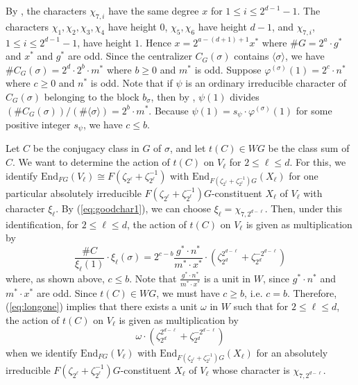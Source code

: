 \documentclass{amsart}
\theoremstyle{plain}
\theoremstyle{definition}
\theoremstyle{remark}
\begin{document}
By \cite{olsson}, the characters $\chi_{7,i}$ have the same degree $x$ for $1\le i\le 2^{d-1}-1$. The characters $\chi_1,\chi_2,\chi_3,\chi_4$ have height $0$, $\chi_5, \chi_6$ have height $d-1$,
and $\chi_{7,i}$, $1\le i\le 2^{d-1}-1$, have height $1$. 
Hence $x=2^{a-(d+1)+1}x^*$ where $\#G=2^a\cdot g^*$ and $x^*$ and $g^*$ are odd. Since the 
centralizer $C_G(\sigma)$ contains $\langle \sigma \rangle$, we have $\# C_G(\sigma)=
2^d\cdot 2^b\cdot m^*$ where $b\ge 0$ and $m^*$ is odd. Suppose $\varphi^{(\sigma)}(1)=
2^c\cdot n^*$ where $c\ge 0$ and $n^*$ is odd. Note that if $\psi$ is an ordinary irreducible 
character of $C_G(\sigma)$ belonging to the block $b_\sigma$, then by \cite[p. 61]{serre}, $\psi(1)$ 
divides $(\# C_G(\sigma))/(\#\langle\sigma\rangle)=2^b\cdot m^*$. Because $\psi(1)=
s_\psi\cdot \varphi^{(\sigma)}(1)$ for some positive integer $s_\psi$, we have $c\le b$. 

Let $C$ be the conjugacy class in $G$ of $\sigma$, and let $t(C)\in WG$ be the class sum of $C$. We 
want to determine the action of $t(C)$ on $V_\ell$ for $2\le \ell\le d$. For this, we identify 
$\mathrm{End}_{FG}(V_\ell)\cong F(\zeta_{2^\ell}+\zeta_{2^\ell}^{-1})$ with 
$\mathrm{End}_{F(\zeta_{2^\ell}+\zeta_{2^\ell}^{-1})G}(X_\ell)$ for one particular absolutely irreducible 
$F(\zeta_{2^\ell}+\zeta_{2^\ell}^{-1})G$-constituent $X_\ell$ of $V_\ell$ with character $\xi_\ell$. 
By (\ref{eq:goodchar1}), we can choose $\xi_\ell=\chi_{7,2^{d-\ell}}$. Then, under this identification, 
for $2\le \ell \le d$, the action of $t(C)$ on $V_\ell$ is given as multiplication by 
\begin{equation}
\label{eq:longone}
\frac{\# C}{\xi_\ell(1)} \cdot \xi_\ell(\sigma)
=2^{c-b} \frac{g^*\cdot n^*}{m^*\cdot x^*}\cdot (\zeta_{2^d}^{2^{d-\ell}}+\zeta_{2^d}^{-2^{d-\ell}})
\end{equation}
where, as shown above, $c\le b$. Note that $\frac{g^*\cdot n^*}{m^*\cdot x^*}$ is a unit in $W$, since 
$g^*\cdot n^*$ and $m^*\cdot x^*$ are odd. Since $t(C)\in WG$, we must have $c\ge b$, i.e. $c=b$.
Therefore, (\ref{eq:longone}) implies that there exists a unit $\omega$ in $W$ such that for 
$2\le \ell \le d$, the action of $t(C)$ on $V_\ell$ is given as multiplication by
\begin{equation}
\label{eq:thatsit}
\omega\cdot (\zeta_{2^d}^{2^{d-\ell}}+\zeta_{2^d}^{-2^{d-\ell}})
\end{equation}
when we identify $\mathrm{End}_{FG}(V_\ell)$ with $\mathrm{End}_{F(\zeta_{2^\ell}+\zeta_{2^\ell}^{-1})
G}(X_\ell)$ for an absolutely irreducible $F(\zeta_{2^\ell}+\zeta_{2^\ell}^{-1})G$-constituent $X_\ell$ of 
$V_\ell$ whose character is $\chi_{7,2^{d-\ell}}$. 
\end{document}
